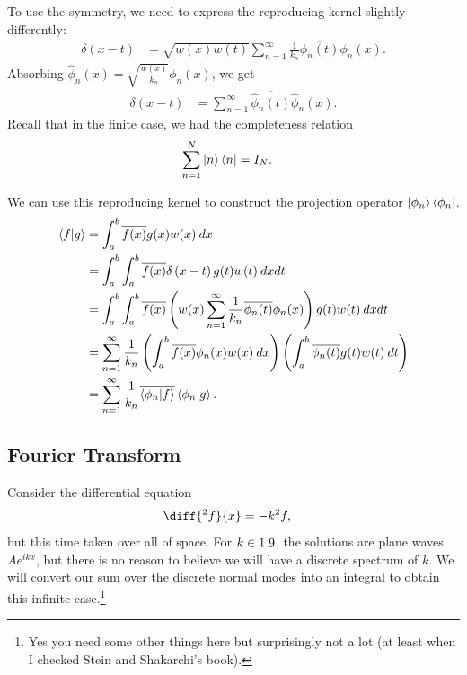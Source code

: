\documentclass[10pt]{mypackage}
\begin{document}
To use the symmetry, we need to express the reproducing kernel slightly differently:
\begin{align*}
  \delta\left(x-t\right) &= \sqrt{w(x)w(t)}\sum_{n=1}^{\infty}\frac{1}{k_n}\overline{\phi_n(t)}\phi_n(x).
\end{align*}
Absorbing $\widehat{\phi}_n(x) = \sqrt{\frac{w(x)}{k_n}}\phi_n(x)$, we get
\begin{align*}
  \delta\left(x-t\right) &= \sum_{n=1}^{\infty}\overline{\widehat{\phi}_n(t)} \widehat{\phi}_n(x).
\end{align*}
Recall that in the finite case, we had the completeness relation
\begin{align*}
  \sum_{n=1}^{N}\ket{n}\bra{n} &= I_N.
\end{align*}
\begin{example}
We can use this reproducing kernel to construct the projection operator $\ket{\phi_n}\bra{\phi_n}$.
\begin{align*}
  \braket{f}{g} &= \int_{a}^{b} \overline{f(x)}g(x)w(x)\:dx\\
                &= \int_{a}^{b}\int_{a}^{b} \overline{f(x)}\delta\left(x-t\right)g(t)w(t)\:dx dt\\
                &= \int_{a}^{b}\int_{a}^{b} \overline{f(x)} \left(w(x)\sum_{n=1}^{\infty}\frac{1}{k_n}\overline{\phi_n(t)}\phi_n(x)\right) g(t)w(t)\:dx dt\\
                &= \sum_{n=1}^{\infty}\frac{1}{k_n} \left(\int_{a}^{b} \overline{f(x)}\phi_n(x)w(x)\:dx\right)\left(\int_{a}^{b} \overline{\phi_n(t)}g(t)w(t)\:dt\right)\\
                &= \sum_{n=1}^{\infty}\frac{1}{k_n} \overline{\braket{\phi_n}{f}} \braket{\phi_n}{g}.
\end{align*}
\end{example}
\subsection{Fourier Transform}%
Consider the differential equation
\begin{align*}
  \diff{^2f}{x} &= -k^2 f,
\end{align*}
but this time taken over all of space. For $k\in 1.9$, the solutions are plane waves $A e^{ikx}$, but there is no reason to believe we will have a discrete spectrum of $k$. We will convert our sum over the discrete normal modes into an integral to obtain this infinite case.\footnote{Yes you need some other things here but surprisingly not a lot (at least when I checked Stein and Shakarchi's book).}\newline
\end{document}
